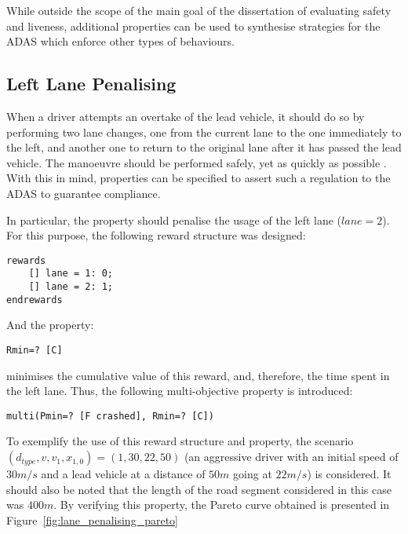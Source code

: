 While outside the scope of the main goal of the dissertation of evaluating safety and liveness, additional properties can be used to synthesise strategies for the ADAS which enforce other types of behaviours. 

\subsection{Left Lane Penalising}

When a driver attempts an overtake of the lead vehicle, it should do so by performing two lane changes, one from the current lane to the one immediately to the left, and another one to return to the original lane after it has passed the lead vehicle. The manoeuvre should be performed safely, yet as quickly as possible \cite{carr}. With this in mind, properties can be specified to assert such a regulation to the ADAS to guarantee compliance.

In particular, the property should penalise the usage of the left lane ($lane = 2$). For this purpose, the following reward structure was designed:

\begin{minipage}{\linewidth}
{\vspace{1em}
\begin{lstlisting}
rewards
	[] lane = 1: 0;
	[] lane = 2: 1;
endrewards
\end{lstlisting}
}
\end{minipage}

And the property:

\begin{minipage}{\linewidth}
{\vspace{1em}
\begin{lstlisting}
Rmin=? [C]
\end{lstlisting}
}
\end{minipage}

minimises the cumulative value of this reward, and, therefore, the time spent in the left lane. Thus, the following multi-objective property is introduced:

\begin{minipage}{\linewidth}
{\vspace{1em}
\begin{lstlisting}
multi(Pmin=? [F crashed], Rmin=? [C])
\end{lstlisting}
}
\end{minipage}

To exemplify the use of this reward structure and property, the scenario $(d_{type}, v, v_1, x_{1,0}) = (1, 30, 22, 50)$ (an aggressive driver with an initial speed of $30m/s$ and a lead vehicle at a distance of $50m$ going at $22m/s$) is considered. It should also be noted that the length of the road segment considered in this case was $400m$. By verifying this property, the Pareto curve obtained is presented in Figure~\ref{fig:lane_penalising_pareto}


